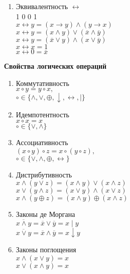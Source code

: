 \begin{minipage}[t]{0.4 \textwidth}
\begin{enumerate}
            \item Эквивалентность $\leftrightarrow$\\ 1 0 0 1\\
            $x \leftrightarrow y = (x \rightarrow y) \wedge (y \rightarrow x)$\\
            $x \leftrightarrow y = (x \wedge y) \vee (\overline x \wedge \overline y)$\\
            $x \leftrightarrow y = (\overline x \vee y) \wedge (x \vee \overline y)$\\
            $x \leftrightarrow x = 1$\\
            $x \leftrightarrow 0 = \overline x$\\
        \end{enumerate}

    \end{minipage}
    \begin{minipage}[t]{0.5\textwidth}
        \centering
        \textbf{Свойства логических операций}
        \begin{enumerate}
            \item Коммутативность\\
            $x \circ y = y \circ x,$\\
            $\circ \in \{\wedge, \vee, \oplus, \downarrow, \leftrightarrow, | \}$

            \item Идемпотентность\\
            $x \circ x = x$\\
            $\circ \in \{\vee, \wedge \}$

            \item Ассоциативность\\
            $(x \circ y) \circ z = x \circ (y \circ z),$\\
            $\circ \in \{\vee, \wedge, \oplus, \leftrightarrow \}$\\

            \item Дистрибутивность\\
            $x \wedge (y \vee z) = (x \wedge y) \vee (x \wedge z)$\\
            $x \vee (y \wedge z) = (x \vee y) \wedge (x \vee z)$\\
            $x \wedge (y \oplus z) = (x \wedge y) \oplus (x \wedge z)$

            \item Законы де Моргана\\
            $\overline{x \wedge y} = \overline x \vee \overline y = x \mid y$\\
            $\overline{x \vee y} = \overline x \wedge \overline y = x \downarrow y$

            \item Законы поглощения\\
            $x \wedge (x \vee y) = x$\\
            $x \vee (x \wedge y) = x$

        \end{enumerate}
    \end{minipage}

